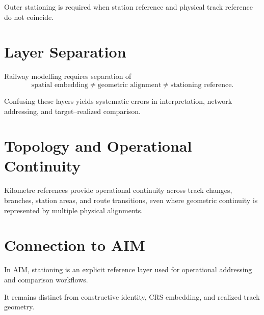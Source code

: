 Outer stationing is required when station reference and physical track
reference do not coincide.

\section{Layer Separation}

\begin{proposition}
Railway modelling requires separation of
\[
\text{spatial embedding}
\neq
\text{geometric alignment}
\neq
\text{stationing reference}.
\]
\end{proposition}

Confusing these layers yields systematic errors in interpretation,
network addressing, and target--realized comparison.

\section{Topology and Operational Continuity}


Kilometre references provide operational continuity across track changes,
branches, station areas, and route transitions, even where geometric
continuity is represented by multiple physical alignments.

\section{Connection to AIM}

\begin{summary}
In AIM, stationing is an explicit reference layer used for operational
addressing and comparison workflows.

It remains distinct from constructive identity, CRS embedding, and
realized track geometry.
\end{summary}
